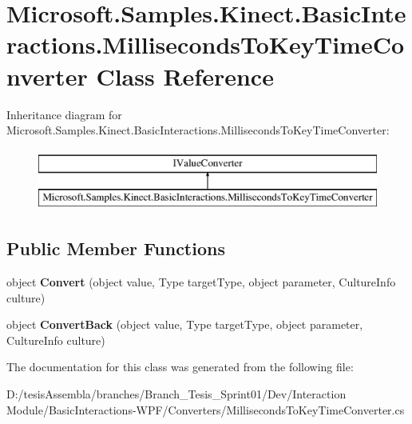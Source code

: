 \hypertarget{class_microsoft_1_1_samples_1_1_kinect_1_1_basic_interactions_1_1_milliseconds_to_key_time_converter}{\section{Microsoft.\-Samples.\-Kinect.\-Basic\-Interactions.\-Milliseconds\-To\-Key\-Time\-Converter Class Reference}
\label{class_microsoft_1_1_samples_1_1_kinect_1_1_basic_interactions_1_1_milliseconds_to_key_time_converter}
}
Inheritance diagram for Microsoft.\-Samples.\-Kinect.\-Basic\-Interactions.\-Milliseconds\-To\-Key\-Time\-Converter\-:\begin{figure}[H]
\begin{center}
\leavevmode
\includegraphics[height=2.000000cm]{class_microsoft_1_1_samples_1_1_kinect_1_1_basic_interactions_1_1_milliseconds_to_key_time_converter}
\end{center}
\end{figure}
\subsection*{Public Member Functions}
\begin{DoxyCompactItemize}
\item 
\hypertarget{class_microsoft_1_1_samples_1_1_kinect_1_1_basic_interactions_1_1_milliseconds_to_key_time_converter_a96d4111ee42ffbc9cb696c09b6aa31f6}{object {\bfseries Convert} (object value, Type target\-Type, object parameter, Culture\-Info culture)}\label{class_microsoft_1_1_samples_1_1_kinect_1_1_basic_interactions_1_1_milliseconds_to_key_time_converter_a96d4111ee42ffbc9cb696c09b6aa31f6}

\item 
\hypertarget{class_microsoft_1_1_samples_1_1_kinect_1_1_basic_interactions_1_1_milliseconds_to_key_time_converter_a983002a005571e093af34863d2dbee8d}{object {\bfseries Convert\-Back} (object value, Type target\-Type, object parameter, Culture\-Info culture)}\label{class_microsoft_1_1_samples_1_1_kinect_1_1_basic_interactions_1_1_milliseconds_to_key_time_converter_a983002a005571e093af34863d2dbee8d}

\end{DoxyCompactItemize}


The documentation for this class was generated from the following file\-:\begin{DoxyCompactItemize}
\item 
D\-:/tesis\-Assembla/branches/\-Branch\-\_\-\-Tesis\-\_\-\-Sprint01/\-Dev/\-Interaction Module/\-Basic\-Interactions-\/\-W\-P\-F/\-Converters/Milliseconds\-To\-Key\-Time\-Converter.\-cs\end{DoxyCompactItemize}
